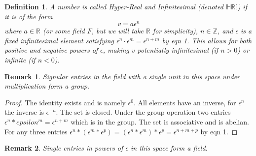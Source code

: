 \documentclass[10pt, oneside]{article}
\newcommand{\HRI}{\mathbb{HRI}}
\newtheorem{defn}{Definition}
\newtheorem{rem}{Remark}
\begin{document}
\begin{defn}
    A number is called \textit{Hyper-Real and Infinitesimal} (denoted \( \HRI \)) if it is of the form
    \[
    v = a \epsilon^n
    \]
    where \( a \in \mathbb{R} \) (or some field \( F \), but we will take \( \mathbb{R} \) for simplicity), \( n \in \mathbb{Z} \), and \( \epsilon \) is a fixed infinitesimal element satisfying \( \epsilon^n \cdot \epsilon^m = \epsilon^{n+m} \) by eqn 1. This allows for both positive and negative powers of \( \epsilon \), making \( v \) potentially infinitesimal (if \( n > 0 \)) or infinite (if \( n < 0 \)).
\end{defn}
\begin{rem}
    Signular entries in the field with a single unit in this space under multiplication form a group. 
\end{rem}
\begin{proof}
    The identity exists and is namely $\epsilon^{0}$.
    All elements have an inverse, for $\epsilon^{n}$ the inverse is $\epsilon^{-n}$.
    The set is closed. Under the group operation two entries $\epsilon^{n}*epsilon^{m} = \epsilon^{n+m}$ which is in the group. 
    The set is associative and is abelian. For any three entries $\epsilon^{n} * (\epsilon^{m} * \epsilon^{p}) = (\epsilon^{n} * \epsilon^{m}) * \epsilon^{p}=\epsilon^{n+m+p}$ by eqn 1.
\end{proof}
\begin{rem}
    Single entries in powers of $\epsilon$ in this space form a field. 
\end{rem}
\end{document}
